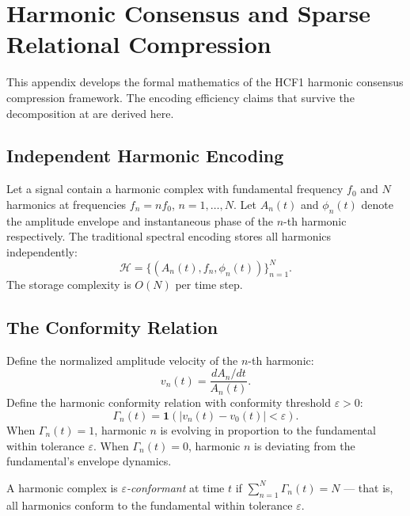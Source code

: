 
\chapter{Harmonic Consensus and Sparse Relational Compression}
\label{app:harmonic}

\noindent
This appendix develops the formal mathematics of the
HCF1 harmonic consensus compression framework. The
encoding efficiency claims that survive the decomposition
at \LevelI{} are derived here.

\section{Independent Harmonic Encoding}
\label{app-c:independent}

Let a signal contain a harmonic complex with fundamental
frequency $f_0$ and $N$ harmonics at frequencies
$f_n = n f_0$, $n = 1, \ldots, N$. Let $A_n(t)$ and
$\phi_n(t)$ denote the amplitude envelope and instantaneous
phase of the $n$-th harmonic respectively. The
traditional spectral encoding stores all harmonics
independently:
\[
  \mathcal{H} = \{(A_n(t), f_n, \phi_n(t))\}_{n=1}^{N}.
\]
The storage complexity is $O(N)$ per time step.

\section{The Conformity Relation}
\label{app-c:conformity}

Define the normalized amplitude velocity of the $n$-th
harmonic:
\[
  v_n(t) = \frac{dA_n/dt}{A_n(t)}.
\]
Define the harmonic conformity relation with conformity
threshold $\varepsilon > 0$:
\[
  \Gamma_n(t) = \mathbf{1}\!\left(|v_n(t) - v_0(t)| < \varepsilon\right).
\]
When $\Gamma_n(t) = 1$, harmonic $n$ is evolving in
proportion to the fundamental within tolerance
$\varepsilon$. When $\Gamma_n(t) = 0$, harmonic $n$
is deviating from the fundamental's envelope dynamics.

\begin{definition}
A harmonic complex is \emph{$\varepsilon$-conformant}
at time $t$ if $\sum_{n=1}^{N} \Gamma_n(t) = N$ ---
that is, all harmonics conform to the fundamental
within tolerance $\varepsilon$.
\end{definition}

